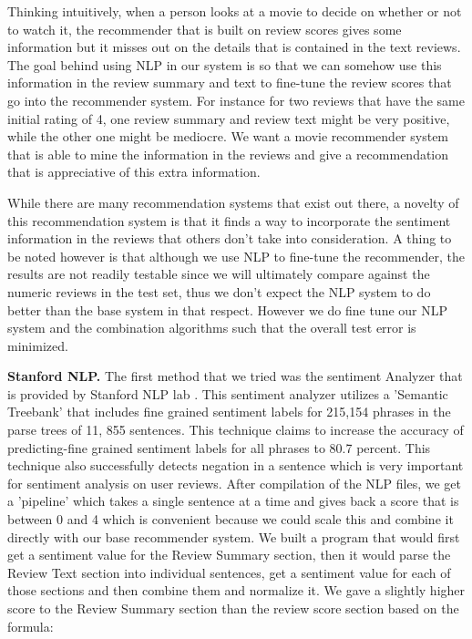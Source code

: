 \documentclass{article} %
\begin{document}
Thinking intuitively, when a person looks at a movie to decide on whether or not to watch it, the recommender that is built on review scores gives some information but it misses out on the details that is contained in the text reviews. The goal behind using NLP in our system is so that we can somehow use this information in the review summary and text to fine-tune the review scores that go into the recommender system. For instance for two reviews that have the same initial rating of 4, one review summary and review text might be very positive, while the other one might be mediocre. We want a movie recommender system that is able to mine the information in the reviews and give a recommendation that is appreciative of this extra information.  

While there are many recommendation systems that exist out there, a novelty of this recommendation system is that it finds a way to incorporate the sentiment information in the reviews that others don't take into consideration. A thing to be noted however is that although we use NLP to fine-tune the recommender, the results are not readily testable since we will ultimately compare against the numeric reviews in the test set, thus we don't expect the NLP system to do better than the base system in that respect. However we do fine tune our NLP system and the combination algorithms such that the overall test error is minimized.  
 
\textbf{Stanford NLP.} The first method that we tried was the sentiment Analyzer that is provided by Stanford NLP lab \cite{StanfordPaper}. This sentiment analyzer utilizes a 'Semantic Treebank' that includes fine grained sentiment labels for 215,154 phrases in the parse trees of 11, 855 sentences. This technique claims to increase the accuracy of predicting-fine grained sentiment labels for all phrases to 80.7 percent. This technique also successfully detects negation in a sentence which is very important for sentiment analysis on user reviews. After compilation of the NLP files, we get a 'pipeline' which takes a single sentence at a time and gives back a score that is between 0 and 4 which is convenient because we could scale this and combine it directly with our base recommender system. We built a program that would first get a sentiment value for the Review Summary section, then it would parse the Review Text section into individual sentences, get a sentiment value for each of those sections and then combine them and normalize it. We gave a slightly higher score to the Review Summary section than the review score section based on the formula:
\end{document}
